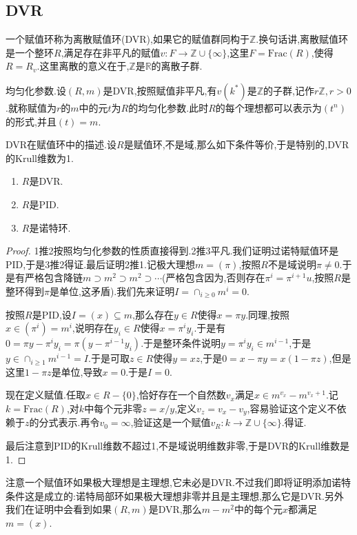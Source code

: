 \newpage
\subsection{DVR}

一个赋值环称为离散赋值环(DVR),如果它的赋值群同构于$\mathbb{Z}$.换句话讲,离散赋值环是一个整环$R$,满足存在非平凡的赋值$v:F\to\mathbb{Z}\cup\{\infty\}$,这里$F=\mathrm{Frac}(R)$,使得$R=R_v$.这里离散的意义在于,$\mathbb{Z}$是$\mathbb{R}$的离散子群.

均匀化参数.设$(R,m)$是DVR,按照赋值非平凡,有$v(k^*)$是$\mathbb{Z}$的子群,记作$r\mathbb{Z},r>0$.就称赋值为$r$的$m$中的元$t$为$R$的均匀化参数.此时$R$的每个理想都可以表示为$(t^n)$的形式,并且$(t)=m$.

DVR在赋值环中的描述.设$R$是赋值环,不是域,那么如下条件等价,于是特别的,DVR的Krull维数为1.
\begin{enumerate}
	\item $R$是DVR.
	\item $R$是PID.
	\item $R$是诺特环.
\end{enumerate}
\begin{proof}
	
	1推2按照均匀化参数的性质直接得到.2推3平凡.我们证明过诺特赋值环是PID,于是3推2得证.最后证明2推1.记极大理想$m=(\pi)$,按照$R$不是域说明$\pi\not=0$.于是有严格包含降链$m\supset m^2\supset m^2\supset\cdots$(严格包含因为,否则存在$\pi^i=\pi^{i+1}u$,按照$R$是整环得到$\pi$是单位,这矛盾).我们先来证明$I=\cap_{i\ge0}m^i=0$.
	
	按照$R$是PID,设$I=(x)\subseteq m$,那么存在$y\in R$使得$x=\pi y$.同理,按照$x\in(\pi^i)=m^i$,说明存在$y_i\in R$使得$x=\pi^iy_i$.于是有$0=\pi y-\pi^iy_i=\pi(y-\pi^{i-1}y_i)$.于是整环条件说明$y=\pi^iy_i\in m^{i-1}$,于是$y\in\cap_{i\ge1}m^{i-1}=I$.于是可取$z\in R$使得$y=xz$,于是$0=x-\pi y=x(1-\pi z)$,但是这里$1-\pi z$是单位,导致$x=0$.于是$I=0$.
	
	现在定义赋值.任取$x\in R-\{0\}$,恰好存在一个自然数$v_x$满足$x\in m^{v_x}-m^{v_x+1}$.记$k=\mathrm{Frac}(R)$,对$k$中每个元非零$z=x/y$,定义$v_z=v_x-v_y$,容易验证这个定义不依赖于$z$的分式表示.再令$v_0=\infty$,验证这是一个赋值$v_R:k\to\mathbb{Z}\cup\{\infty\}$.得证.
	
	最后注意到PID的Krull维数不超过1,不是域说明维数非零,于是DVR的Krull维数是1.
\end{proof}

注意一个赋值环如果极大理想是主理想,它未必是DVR.不过我们即将证明添加诺特条件这是成立的:诺特局部环如果极大理想非零并且是主理想,那么它是DVR.另外我们在证明中会看到如果$(R,m)$是DVR,那么$m-m^2$中的每个元$x$都满足$m=(x)$.

